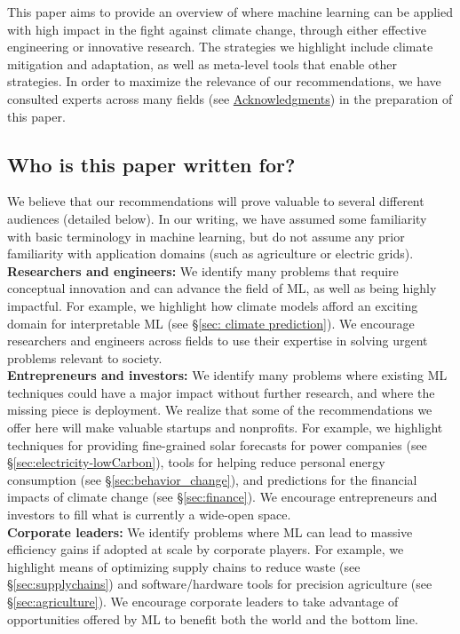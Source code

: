 \documentclass[11pt]{report}
\begin{document}
This paper aims to provide an overview of where machine learning can be applied with high impact in the fight against climate change, through either effective engineering or innovative research. The strategies we highlight include climate mitigation and adaptation, as well as meta-level tools that enable other strategies. In order to maximize the relevance of our recommendations, we have consulted experts across many fields (see \hyperref[sec:acknowledgments]{{\small{Acknowledgments}}}) in the preparation of this paper.




\subsection*{Who is this paper written for?}

We believe that our recommendations will prove valuable to several different audiences (detailed below). In our writing, we have assumed some familiarity with basic terminology in machine learning, but do not assume any prior familiarity with application domains (such as agriculture or electric grids).\\

\textbf{Researchers and engineers:}
We identify many problems that require conceptual innovation and can advance the field of ML, as well as being highly impactful. For example, we highlight how climate models afford an exciting domain for interpretable ML (see \S\ref{sec: climate prediction}).
We encourage researchers and engineers across fields to use their expertise in solving urgent problems relevant to society.\\

\textbf{Entrepreneurs and investors:} We identify many problems where existing ML techniques could have a major impact without further research, and where the missing piece is deployment. We realize that some of the recommendations we offer here will make valuable startups and nonprofits. For example, we highlight techniques for providing fine-grained solar forecasts for power companies (see \S\ref{sec:electricity-lowCarbon}), tools for helping reduce personal energy consumption (see \S\ref{sec:behavior_change}), and predictions for the financial impacts of climate change (see \S\ref{sec:finance}). We encourage entrepreneurs and investors to fill what is currently a wide-open space.\\

\textbf{Corporate leaders:} We identify problems where ML can lead to massive efficiency gains if adopted at scale by corporate players. For example, we highlight means of optimizing supply chains to reduce waste (see \S\ref{sec:supplychains}) and software/hardware tools for precision agriculture (see \S\ref{sec:agriculture}). We encourage corporate leaders to take advantage of opportunities offered by ML to benefit both the world and the bottom line.\\
\end{document}
